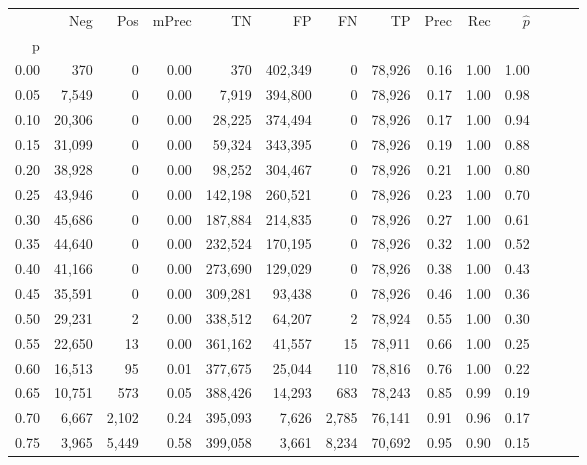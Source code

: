 \begin{tabular}{rrrrrrrrrrrrrr}
\toprule
{} &     Neg &     Pos & mPrec &       TN &       FP &      FN &      TP &  Prec &   Rec & $\hat{p}$ \\
p    &         &         &       &          &          &         &         &       &       &           \\
\midrule
0.00 &     370 &       0 &  0.00 &      370 &  402,349 &       0 &  78,926 &  0.16 &  1.00 &      1.00 \\
0.05 &   7,549 &       0 &  0.00 &    7,919 &  394,800 &       0 &  78,926 &  0.17 &  1.00 &      0.98 \\
0.10 &  20,306 &       0 &  0.00 &   28,225 &  374,494 &       0 &  78,926 &  0.17 &  1.00 &      0.94 \\
0.15 &  31,099 &       0 &  0.00 &   59,324 &  343,395 &       0 &  78,926 &  0.19 &  1.00 &      0.88 \\
0.20 &  38,928 &       0 &  0.00 &   98,252 &  304,467 &       0 &  78,926 &  0.21 &  1.00 &      0.80 \\
0.25 &  43,946 &       0 &  0.00 &  142,198 &  260,521 &       0 &  78,926 &  0.23 &  1.00 &      0.70 \\
0.30 &  45,686 &       0 &  0.00 &  187,884 &  214,835 &       0 &  78,926 &  0.27 &  1.00 &      0.61 \\
0.35 &  44,640 &       0 &  0.00 &  232,524 &  170,195 &       0 &  78,926 &  0.32 &  1.00 &      0.52 \\
0.40 &  41,166 &       0 &  0.00 &  273,690 &  129,029 &       0 &  78,926 &  0.38 &  1.00 &      0.43 \\
0.45 &  35,591 &       0 &  0.00 &  309,281 &   93,438 &       0 &  78,926 &  0.46 &  1.00 &      0.36 \\
0.50 &  29,231 &       2 &  0.00 &  338,512 &   64,207 &       2 &  78,924 &  0.55 &  1.00 &      0.30 \\
0.55 &  22,650 &      13 &  0.00 &  361,162 &   41,557 &      15 &  78,911 &  0.66 &  1.00 &      0.25 \\
0.60 &  16,513 &      95 &  0.01 &  377,675 &   25,044 &     110 &  78,816 &  0.76 &  1.00 &      0.22 \\
0.65 &  10,751 &     573 &  0.05 &  388,426 &   14,293 &     683 &  78,243 &  0.85 &  0.99 &      0.19 \\
0.70 &   6,667 &   2,102 &  0.24 &  395,093 &    7,626 &   2,785 &  76,141 &  0.91 &  0.96 &      0.17 \\
0.75 &   3,965 &   5,449 &  0.58 &  399,058 &    3,661 &   8,234 &  70,692 &  0.95 &  0.90 &      0.15 \\

\end{tabular}
